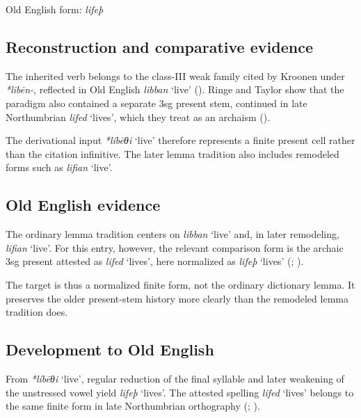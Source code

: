 \documentclass[
  british,
  a4paper,
  openany]{book}
\providecommand{\Recon}[1]{\emph{*#1}}
{\catcode`→=\active \global\def→{\ensuremath{\rightarrow}}}
\providecommand{\Recon}[1]{\emph{*#1}}
{\catcode`→=\active \global\def→{\ensuremath{\rightarrow}}}
\begin{document}
Old English form: \emph{lifeþ}

\subsection{Reconstruction and comparative
evidence}\label{reconstruction-and-comparative-evidence-117}

The inherited verb belongs to the class-III weak family cited by Kroonen
under \emph{*libēn-}, reflected in Old English {\emph{libban}} `live'
(). Ringe and Taylor show
that the paradigm also contained a separate 3sg present stem, continued
in late Northumbrian {\emph{lifed}} `lives', which they treat as an
archaism ().

The derivational input {\Recon{líbēθi} `live'} therefore represents a
finite present cell rather than the citation infinitive. The later lemma
tradition also includes remodeled forms such as {\emph{lifian}} `live'.

\subsection{Old English evidence}\label{old-english-evidence-117}

The ordinary lemma tradition centers on {\emph{libban}} `live' and, in
later remodeling, {\emph{lifian}} `live'. For this entry, however, the
relevant comparison form is the archaic 3sg present attested as
{\emph{lifed}} `lives', here normalized as {\emph{lifeþ}} `lives'
(;
).

The target is thus a normalized finite form, not the ordinary dictionary
lemma. It preserves the older present-stem history more clearly than the
remodeled lemma tradition does.

\subsection{Development to Old
English}\label{development-to-old-english-117}

From {\Recon{líbēθi} `live'}, regular reduction of the final syllable
and later weakening of the unstressed vowel yield {\emph{lifeþ}}
`lives'. The attested spelling {\emph{lifed}} `lives' belongs to the
same finite form in late Northumbrian orthography
(;
).
\end{document}
